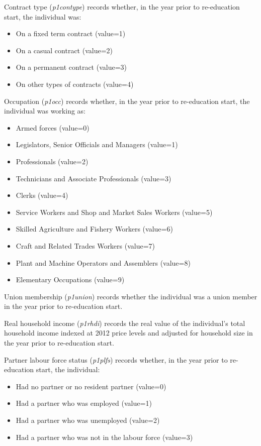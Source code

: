 \documentclass[12pt, a4paper]{article}
\begin{document}
Contract type (\textit{p1\textunderscore{}contype}) records whether, in the year prior to re-education start, the individual was:
\begin{itemize}
  \item On a fixed term contract (value=1)
  \item On a casual contract (value=2)
  \item On a permanent contract (value=3)
  \item On other types of contracts  (value=4)
\end{itemize}  

Occupation (\textit{p1\textunderscore{}occ}) records whether, in the year prior to re-education start, the individual was working as:
\begin{itemize}
  \item Armed forces (value=0)
  \item Legislators, Senior Officials and Managers (value=1)
  \item Professionals (value=2)
  \item Technicians and Associate Professionals (value=3)
  \item Clerks (value=4)
  \item Service Workers and Shop and Market Sales Workers (value=5)
  \item Skilled Agriculture and Fishery Workers (value=6)
  \item Craft and Related Trades Workers (value=7)
  \item Plant and Machine Operators and Assemblers (value=8)
  \item Elementary Occupations (value=9)
\end{itemize}  

Union membership (\textit{p1\textunderscore{}union}) records whether the individual was a union member in the year prior to re-education start.

Real household income (\textit{p1\textunderscore{}rhdi}) records the real value of the individual’s total household income indexed at 2012 price levels and adjusted for household size in the year prior to re-education start.

Partner labour force status (\textit{p1\textunderscore{}plfs}) records whether, in the year prior to re-education start, the individual:
\begin{itemize}
  \item Had no partner or no resident partner (value=0)
  \item Had a partner who was employed (value=1)
  \item Had a partner who was unemployed (value=2)
  \item Had a partner who was not in the labour force (value=3)
\end{itemize}  
\end{document}

